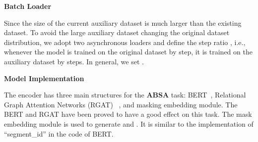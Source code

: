 \documentclass[11pt]{article}
\begin{document}
\textbf{Batch Loader}

Since the size of the current auxiliary dataset is much larger than the existing dataset. To avoid the large auxiliary dataset changing the original dataset distribution, we adopt two asynchronous loaders and define the step ratio , i.e., whenever the model is trained on the original dataset by  step, it is trained on the auxiliary dataset by  steps. In general, we set .

\textbf{Model Implementation}



The encoder has three main structures for the \textbf{ABSA} task: BERT~\cite{devlin2018bert}, Relational Graph Attention Networks (RGAT) ~\cite{wang2020relational}, and masking embedding module. 
The BERT and RGAT have been proved to have a good effect on this task.
The mask embedding module is used to generate  and . It is similar to the implementation of ``segment\_id'' in the code of BERT. 
\end{document}
